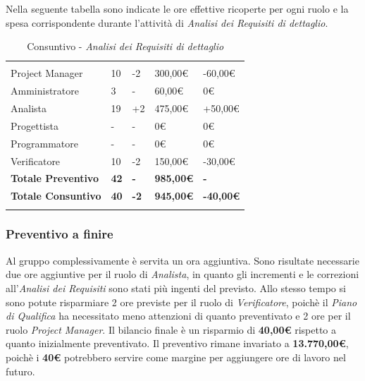 Nella seguente tabella sono indicate le ore effettive ricoperte per ogni ruolo e la spesa corrispondente durante l'attività di \textit{Analisi dei Requisiti di dettaglio}.
\label{sec:tabellaConsuntivoAdRdD}
\begin{table}[H]
	\centering
	\begin{tabular}{|p{3.8cm}|C{2.6cm}|C{2.9cm}|C{2.7cm}|C{3.3cm}|}
		
		 & & & & \\
		Project Manager  & 10 & -2 & 300,00\euro & -60,00\euro \\
		\hline
		Amministratore& 3 & - & 60,00\euro & 0\euro \\
		\hline
		Analista      & 19 & +2 & 475,00\euro & +50,00\euro \\
		\hline
		Progettista   & -  & - & 0\euro & 0\euro \\
		\hline
		Programmatore & -  & - & 0\euro & 0\euro \\
		\hline
		Verificatore  & 10 & -2 & 150,00\euro & -30,00\euro \\
		\textbf{Totale Preventivo} & \textbf{42} & \textbf{-} & \textbf{985,00\euro} & \textbf{-}\\
		\textbf{Totale Consuntivo} & \textbf{40} & \textbf{-2} & \textbf{945,00\euro} & \textbf{-40,00\euro}\\
	\end{tabular}
	\caption{Consuntivo - \textit{Analisi dei Requisiti di dettaglio}}
	
\end{table}
\subsubsection{Preventivo a finire}
Al gruppo complessivamente è servita un ora aggiuntiva. Sono risultate necessarie due ore aggiuntive per il ruolo di \textit{Analista}, in quanto gli incrementi e le correzioni all'\textit{Analisi dei Requisiti} sono stati più ingenti del previsto. Allo stesso tempo si sono potute risparmiare 2 ore previste per il ruolo di \textit{Verificatore}, poichè il \textit{Piano di Qualifica} ha necessitato meno attenzioni di quanto preventivato e 2 ore per il ruolo \textit{Project Manager}. Il bilancio finale è un risparmio di \textbf{40,00\euro} rispetto a quanto inizialmente preventivato. Il preventivo rimane invariato a \textbf{13.770,00\euro}, poichè i \textbf{40\euro}  potrebbero servire come margine per aggiungere ore di lavoro nel futuro.


